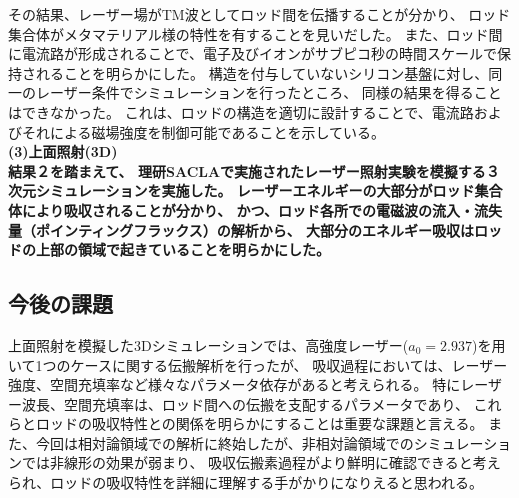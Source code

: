\documentclass[a4paper,11pt,titlepage]{jsarticle}
\begin{document}
    その結果、レーザー場がTM波としてロッド間を伝播することが分かり、
    ロッド集合体がメタマテリアル様の特性を有することを見いだした。
    また、ロッド間に電流路が形成されることで、電子及びイオンがサブピコ秒の時間スケールで保持されることを明らかにした。
    構造を付与していないシリコン基盤に対し、同一のレーザー条件でシミュレーションを行ったところ、
    同様の結果を得ることはできなかった。
    これは、ロッドの構造を適切に設計することで、電流路およびそれによる磁場強度を制御可能であることを示している。\\
    \bf
    (3)上面照射(3D)\\
    \rm
    結果２を踏まえて、
    理研SACLAで実施されたレーザー照射実験を模擬する３次元シミュレーションを実施した。
    レーザーエネルギーの大部分がロッド集合体により吸収されることが分かり、
    かつ、ロッド各所での電磁波の流入・流失量（ポインティングフラックス）の解析から、
    大部分のエネルギー吸収はロッドの上部の領域で起きていることを明らかにした。
    \subsection{今後の課題}
    上面照射を模擬した3Dシミュレーションでは、高強度レーザー($a_0=2.937$)を用いて1つのケースに関する伝搬解析を行ったが、
    吸収過程においては、レーザー強度、空間充填率など様々なパラメータ依存があると考えられる。
    特にレーザー波長、空間充填率は、ロッド間への伝搬を支配するパラメータであり、
    これらとロッドの吸収特性との関係を明らかにすることは重要な課題と言える。
    また、今回は相対論領域での解析に終始したが、非相対論領域でのシミュレーションでは非線形の効果が弱まり、
    吸収伝搬素過程がより鮮明に確認できると考えられ、ロッドの吸収特性を詳細に理解する手がかりになりえると思われる。

    \newpage
\end{document}
